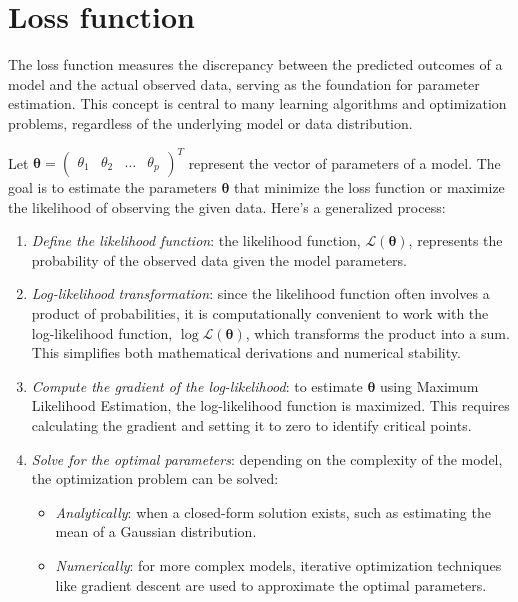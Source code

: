 \section{Loss function}

The loss function measures the discrepancy between the predicted outcomes of a model and the actual observed data, serving as the foundation for parameter estimation.
This concept is central to many learning algorithms and optimization problems, regardless of the underlying model or data distribution.

Let $\boldsymbol{\theta}=\begin{pmatrix} \theta_1 & \theta_2 & \dots & \theta_p \end{pmatrix}^T$ represent the vector of parameters of a model. 
The goal is to estimate the parameters $\boldsymbol{\theta}$ that minimize the loss function or maximize the likelihood of observing the given data.
Here's a generalized process:
\begin{enumerate}
    \item \textit{Define the likelihood function}: the likelihood function, $\mathcal{L}(\boldsymbol{\theta})$, represents the probability of the observed data given the model parameters. 
    \item \textit{Log-likelihood transformation}: since the likelihood function often involves a product of probabilities, it is computationally convenient to work with the log-likelihood function, $\log \mathcal{L}(\boldsymbol{\theta})$, which transforms the product into a sum. 
        This simplifies both mathematical derivations and numerical stability.
    \item \textit{Compute the gradient of the log-likelihood}: to estimate $\boldsymbol{\theta}$ using Maximum Likelihood Estimation, the log-likelihood function is maximized. 
        This requires calculating the gradient and setting it to zero to identify critical points.
    \item \textit{Solve for the optimal parameters}: depending on the complexity of the model, the optimization problem can be solved:
        \begin{itemize}
            \item \textit{Analytically}: when a closed-form solution exists, such as estimating the mean of a Gaussian distribution.
            \item \textit{Numerically}: for more complex models, iterative optimization techniques like gradient descent are used to approximate the optimal parameters.
        \end{itemize}
\end{enumerate}

